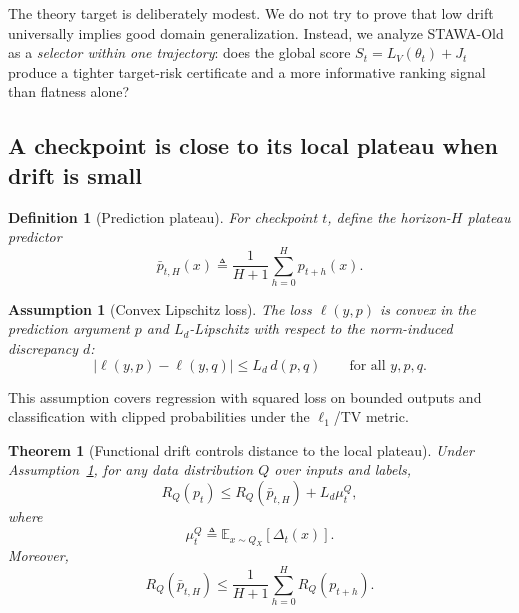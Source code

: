 \documentclass{article}
\newtheorem{theorem}{Theorem}
\newtheorem{definition}{Definition}
\newtheorem{assumption}{Assumption}
\newcommand{\EE}{\mathbb{E}}
\begin{document}
The theory target is deliberately modest. We do not try to prove that low drift universally implies good domain generalization. Instead, we analyze STAWA-Old as a \emph{selector within one trajectory}: does the global score $S_t = L_V(\theta_t) + J_t$ produce a tighter target-risk certificate and a more informative ranking signal than flatness alone?

\subsection{A checkpoint is close to its local plateau when drift is small}

\begin{definition}[Prediction plateau]
For checkpoint $t$, define the horizon-$H$ plateau predictor
\begin{equation}
    \bar p_{t,H}(x)
    \triangleq
    \frac{1}{H+1}\sum_{h=0}^{H} p_{t+h}(x).
    \label{eq:plateau}
\end{equation}
\end{definition}

\begin{assumption}[Convex Lipschitz loss]
\label{ass:lipschitz}
The loss $\ell(y,p)$ is convex in the prediction argument $p$ and $L_d$-Lipschitz with respect to the norm-induced discrepancy $d$:
\begin{equation}
    |\ell(y,p)-\ell(y,q)| \le L_d\, d(p,q)
    \qquad
    \text{for all } y,p,q.
\end{equation}
\end{assumption}

This assumption covers regression with squared loss on bounded outputs and classification with clipped probabilities under the $\ell_1$/TV metric.

\begin{theorem}[Functional drift controls distance to the local plateau]
\label{thm:plateau}
Under Assumption~\ref{ass:lipschitz}, for any data distribution $Q$ over inputs and labels,
\begin{equation}
    R_Q(p_t)
    \le
    R_Q(\bar p_{t,H}) + L_d \mu_t^Q,
    \label{eq:plateau_bound}
\end{equation}
where
\begin{equation}
    \mu_t^Q \triangleq \EE_{x\sim Q_X}\!\left[\Delta_t(x)\right].
\end{equation}
Moreover,
\begin{equation}
    R_Q(\bar p_{t,H})
    \le
    \frac{1}{H+1}\sum_{h=0}^{H} R_Q(p_{t+h}).
    \label{eq:plateau_jensen}
\end{equation}
\end{theorem}
\end{document}

